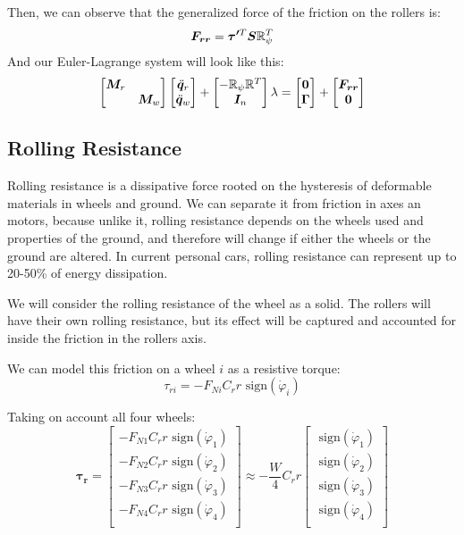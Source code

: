 \documentclass[twoside,onecolumn]{article}
\let\oldsubsection\subsection
\renewcommand\subsection{\Needspace{13\baselineskip}\oldsubsection}
\renewcommand{\vec}[1]{\bm{#1}}
\newcommand{\R}{\mathbb R}
\newcommand{\mat}[2][b]{\begin{#1matrix}#2\end{#1matrix}}
\begin{document}
Then, we can observe that the generalized force of the friction on the rollers is:
$$\vec{F_{rr}} = \vec{\tau'}^T\S\R_{\psi}^T$$
And our Euler-Lagrange system will look like this:
\begin{gather}
\mat{\M_r & \\ & \M_w}\mat{\ddot \q_r\\\ddot \q_w}+
\mat{
	-\R_{\psi}\R ^T  \\
	\vec I_n}\lambda
=\mat{\vec 0\\\Torque} + \mat{\vec{F_{rr}}\\\vec{0}} \label{eq:sol5}
\end{gather}

\subsection{Rolling Resistance}

Rolling resistance is a dissipative force rooted on the hysteresis of deformable materials in wheels and ground. We can separate it from friction in axes an motors, because unlike it, rolling resistance depends on the wheels used and properties of the ground, and therefore will change if either the wheels or the ground are altered. In current personal cars, rolling resistance can represent up to 20-50\% of energy dissipation.

We will consider the rolling resistance of the wheel as a solid. The rollers will have their own rolling resistance, but its effect will be captured and accounted for inside the friction in the rollers axis.

We can model this friction on a wheel $i$ as a resistive torque:
$$\tau_{ri} = -F_{Ni}C_r r \text{ sign}(\dot{\varphi}_i)$$ 

Taking on account all four wheels:
$$\vec{\tau_r} = \mat{
	-F_{N1}C_r r \text{ sign}(\dot{\varphi}_1)\\
	-F_{N2}C_r r \text{ sign}(\dot{\varphi}_2)\\
	-F_{N3}C_r r \text{ sign}(\dot{\varphi}_3)\\
	-F_{N4}C_r r \text{ sign}(\dot{\varphi}_4)\\
} \approx -\frac{W}{4}C_r r \mat{
\text{ sign}(\dot{\varphi}_1)\\
\text{ sign}(\dot{\varphi}_2)\\
\text{ sign}(\dot{\varphi}_3)\\
\text{ sign}(\dot{\varphi}_4)\\
}$$
\end{document}
